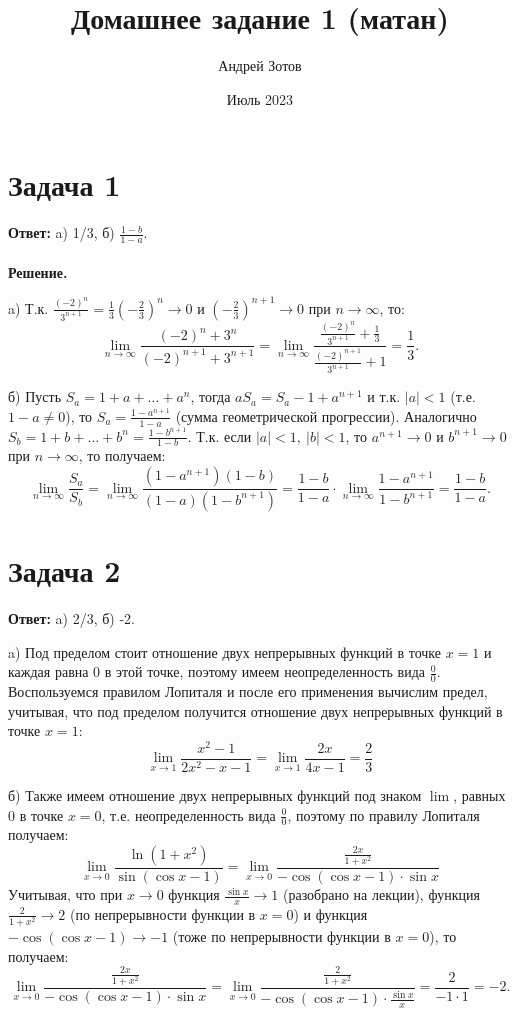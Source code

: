 \documentclass{article}
\title{Домашнее задание 1 (матан)}
\author{Андрей Зотов}
\date{Июль 2023}
\begin{document}
\maketitle

\section*{Задача 1}
{\bf Ответ:} a) 1/3, б) $\frac{1-b}{1-a}$.
\\
\\
{\bf Решение.} 
\par
a) Т.к. $\frac{(-2)^n}{3^{n+1}}=\frac{1}{3}(-\frac{2}{3})^n\rightarrow0$ и $(-\frac{2}{3})^{n+1}\rightarrow0$ при $n\rightarrow\infty$, то:
$$\lim_{n\rightarrow\infty}{\frac{(-2)^n+3^n}{(-2)^{n+1}+3^{n+1}}}=\lim_{n\rightarrow\infty}{\frac{\frac{(-2)^n}{3^{n+1}}+\frac{1}{3}}{\frac{(-2)^{n+1}}{3^{n+1}}+1}}=\frac{1}{3}.$$
\par
б) Пусть $S_a=1+a+\dots+a^n$, тогда $aS_a=S_a-1+a^{n+1}$ и т.к. $|a| < 1$ (т.е. $1-a\neq 0$), то $S_a=\frac{1-a^{n+1}}{1-a}$ (сумма геометрической прогрессии). Аналогично $S_b=1+b+\dots+b^n=\frac{1-b^{n+1}}{1-b}$. Т.к. если $|a| < 1,\ |b| < 1$, то $a^{n+1}\rightarrow 0$ и $b^{n+1}\rightarrow 0$ при $n\rightarrow\infty$, то получаем:
$$\lim_{n\rightarrow\infty}{\frac{S_a}{S_b}}=\lim_{n\rightarrow\infty}{\frac{(1-a^{n+1})(1-b)}{(1-a)(1-b^{n+1})}}=\frac{1-b}{1-a}\cdot\lim_{n\rightarrow\infty}{\frac{1-a^{n+1}}{1-b^{n+1}}}=\frac{1-b}{1-a}.$$
\section*{Задача 2}
{\bf Ответ:} a) 2/3, б) -2.
\par
a) Под пределом стоит отношение двух непрерывных функций в точке $x=1$ и каждая равна $0$ в этой точке, поэтому имеем неопределенность вида $\frac{0}{0}$. Воспользуемся правилом Лопиталя и после его применения вычислим предел, учитывая, что под пределом получится отношение двух непрерывных функций в точке $x=1$:
$$\lim_{x\rightarrow 1}{\frac{x^2-1}{2x^2-x-1}}=\lim_{x\rightarrow 1}{\frac{2x}{4x-1}}=\frac{2}{3}$$
\par
б) Также имеем отношение двух непрерывных функций под знаком $\lim$, равных 0 в точке $x=0$, т.е. неопределенность вида $\frac{0}{0}$, поэтому по правилу Лопиталя получаем:
$$\lim_{x\rightarrow0}{\frac{\ln(1+x^2)}{\sin(\cos{x}-1)}}=\lim_{x\rightarrow 0}{\frac{\frac{2x}{1+x^2}}{-\cos(\cos{x}-1)\cdot\sin{x}}}$$
Учитывая, что при $x\rightarrow0$ функция $\frac{\sin{x}}{x}\rightarrow 1$ (разобрано на лекции), функция $\frac{2}{1+x^2}\rightarrow 2$ (по непрерывности функции в $x=0$) и функция $-\cos(\cos{x}-1)\rightarrow -1$ (тоже по непрерывности функции в $x=0$), то получаем:
$$\lim_{x\rightarrow 0}{\frac{\frac{2x}{1+x^2}}{-\cos(\cos{x}-1)\cdot\sin{x}}}=\lim_{x\rightarrow0}{\frac{\frac{2}{1+x^2}}{-\cos(\cos{x}-1)\cdot\frac{\sin{x}}{x}}}=\frac{2}{-1\cdot 1}=-2.$$
\end{document}

